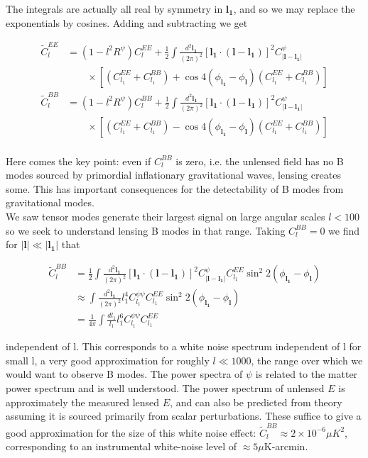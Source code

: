 \documentclass[a4paper,10pt]{article}
\renewcommand{\v}[1]{\mathbf{#1}}
\newcommand{\half}{\frac{1}{2}}
\newcommand{\finttwo}[1]{\int \frac{d^2 \v{#1}}{(2\pi)^2}}
\begin{document}
The integrals are actually all real by symmetry in $\v{l_1}$, and so we may replace the exponentials by cosines. Adding and subtracting we get

\begin{equation}\begin{split}
\tilde{C}_l^{EE} &= (1-l^2R^\psi)C_l^{EE}+\half \finttwo{l_1}[ \v{l_1}\cdot(\v{l}-\v{l_1})]^2 C^\psi_{|\v{l}-\v{l_1}|}\\
&\qquad \times [(C_{l_1}^{EE}+C_{l_1}^{BB})+\cos{4(\phi_\v{l_1}-\phi_\v{l})}(C_{l_1}^{EE}+C_{l_1}^{BB})]\\
\tilde{C}_l^{BB} &= (1-l^2R^\psi)C_l^{BB}+\half \finttwo{l_1}[ \v{l_1}\cdot(\v{l}-\v{l_1})]^2 C^\psi_{|\v{l}-\v{l_1}|}\\
&\qquad \times [(C_{l_1}^{EE}+C_{l_1}^{BB})-\cos{4(\phi_\v{l_1}-\phi_\v{l})}(C_{l_1}^{EE}+C_{l_1}^{BB})]\\
\label{lensedBmodes}
\end{split}\end{equation}

Here comes the key point: even if $C_{l}^{BB}$ is zero, i.e. the unlensed field has no B modes sourced by primordial inflationary gravitational waves, lensing creates some. This has important consequences for the detectability of B modes from gravitational modes.\\

We saw tensor modes generate their largest signal on large angular scales $l<100$ so we seek to understand lensing B modes in that range. Taking $C_l^{BB}=0$ we find for $|\v{l}| \ll |\v{l_1}|$ that 

\begin{equation}\begin{split}
\tilde{C}_l^{BB} &= \half \finttwo{l_1}[ \v{l_1}\cdot(\v{l}-\v{l_1})]^2 C^\psi_{|\v{l}-\v{l_1}|}C_{l_1}^{EE}\sin^2{2(\phi_\v{l_1}-\phi_\v{l})}\\
&\approx \finttwo{l_1} l_1^4C^{\psi\psi}_{l_1}C^{EE}_{l_1}\sin^2{2(\phi_\v{l_1}-\phi_\v{l})}\\
&=\frac{1}{4\pi}\int \frac{dl_1}{l_1}l_1^6C^{\psi\psi}_{l_1}C^{EE}_{l_1}
\end{split}\end{equation}

independent of l. This corresponds to a white noise spectrum independent of l for small l, a very good approximation for roughly $l\ll 1000$, the range over which we would want to observe B modes. The power spectra of $\psi$ is related to the matter power spectrum and is well understood. The power spectrum of unlensed $E$ is approximately the measured lensed $E$, and can also be predicted from theory assuming it is sourced primarily from scalar perturbations. These suffice to give a good approximation for the size of this white noise effect: $\tilde{C}_l^{BB} \approx 2\times10^{-6}\mu K^2$, corresponding to an instrumental white-noise level of $\approx 5\mu$K-arcmin.\\
\end{document}
